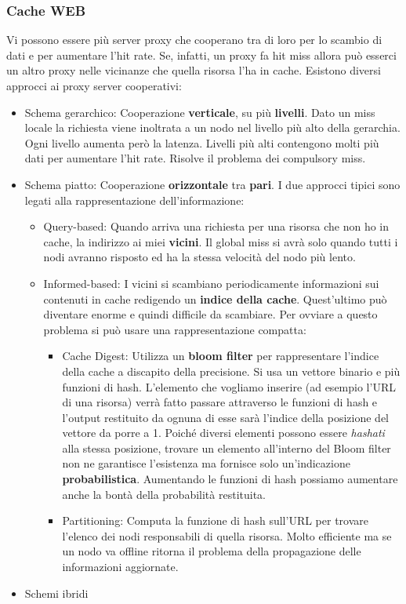 \documentclass{article}
\begin{document}
		\subsubsection{Cache WEB}
		Vi possono essere più server proxy che cooperano tra di loro per lo scambio di dati e per aumentare l'hit rate. Se, infatti, un proxy fa hit miss allora può esserci un altro proxy nelle vicinanze che quella risorsa l'ha in cache. Esistono diversi approcci ai proxy server cooperativi:
		\begin{itemize}
		    \item Schema gerarchico: Cooperazione \textbf{verticale}, su più \textbf{livelli}. Dato un miss locale la richiesta viene inoltrata a un nodo nel livello più alto della gerarchia. Ogni livello aumenta però la latenza. Livelli più alti contengono molti più dati per aumentare l'hit rate. Risolve il problema dei compulsory miss.
		    \item Schema piatto: Cooperazione \textbf{orizzontale} tra \textbf{pari}. I due approcci tipici sono legati alla rappresentazione dell'informazione:
		    \begin{itemize}
		    	\item Query-based: Quando arriva una richiesta per una risorsa che non ho in cache, la indirizzo ai miei \textbf{vicini}. Il global miss si avrà solo quando tutti i nodi avranno risposto ed ha la stessa velocità del nodo più lento.
		    	\item Informed-based: I vicini si scambiano periodicamente informazioni sui contenuti in cache redigendo un \textbf{indice della cache}. Quest'ultimo può diventare enorme e quindi difficile da scambiare. Per ovviare a questo problema si può usare una rappresentazione compatta:
			    \begin{itemize}
			    	\item Cache Digest: Utilizza un \textbf{bloom filter} per rappresentare l'indice della cache a discapito della precisione. Si usa un vettore binario e più funzioni di hash. L'elemento che vogliamo inserire (ad esempio l'URL di una risorsa) verrà fatto passare attraverso le funzioni di hash e l'output restituito da ognuna di esse sarà l'indice della posizione del vettore da porre a 1. Poiché diversi elementi possono essere \textit{hashati} alla stessa posizione, trovare un elemento all'interno del Bloom filter non ne garantisce l'esistenza ma fornisce solo un'indicazione \textbf{probabilistica}. Aumentando le funzioni di hash possiamo aumentare anche la bontà della probabilità restituita.
			    	\item Partitioning: Computa la funzione di hash sull'URL per trovare l'elenco dei nodi responsabili di quella risorsa. Molto efficiente ma se un nodo va offline ritorna il problema della propagazione delle informazioni aggiornate.
			    \end{itemize}
			\end{itemize}
		    
		    \item Schemi ibridi
		\end{itemize}
		
\end{document}
